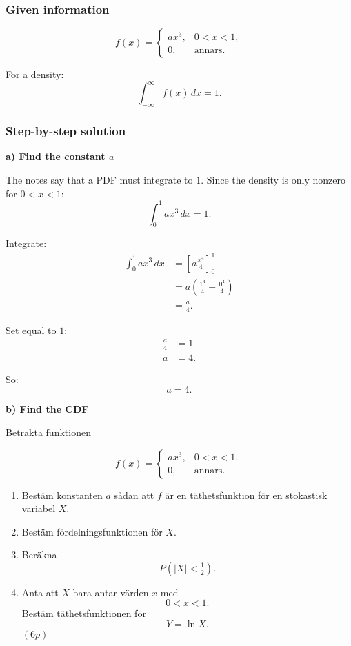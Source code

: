 \documentclass[10pt]{article}
\begin{document}
\subsubsection*{Given information}

\[
f(x)=
\begin{cases}
ax^3,
& 0<x<1,\\
0,
& \text{annars}.
\end{cases}
\]

For a density:
\[
\int_{-\infty}^{\infty}f(x)\,dx=1.
\]

\subsubsection*{Step-by-step solution}

\textbf{a) Find the constant \(a\)}

The notes say that a PDF must integrate to \(1\).
Since the density is only nonzero for \(0<x<1\):
\[
\int_0^1 ax^3\,dx=1.
\]

Integrate:
\begin{align*}
\int_0^1 ax^3\,dx
&=
\left[
a\frac{x^4}{4}
\right]_0^1
\\[2mm]
&=
a\left(
\frac{1^4}{4}
-
\frac{0^4}{4}
\right)
\\[2mm]
&=
\frac{a}{4}.
\end{align*}

Set equal to \(1\):
\begin{align*}
\frac{a}{4}
&=1
\\[2mm]
a&=4.
\end{align*}

So:
\[
a=4.
\]

\textbf{b) Find the CDF}

Betrakta funktionen

\[
f(x)=
\begin{cases}
ax^3,
& 0<x<1,\\
0,
& \text{annars}.
\end{cases}
\]

\begin{enumerate}[label=\alph*)]
\item Bestäm konstanten \(a\) sådan att \(f\) är en
täthetsfunktion för en stokastisk variabel \(X\).

\item Bestäm fördelningsfunktionen för \(X\).

\item Beräkna
\[
P(|X|<\tfrac12).
\]

\item Anta att \(X\) bara antar värden \(x\) med
\[
0<x<1.
\]
Bestäm täthetsfunktionen för
\[
Y=\ln X.
\]
\((6p)\)
\end{enumerate}
\end{document}
